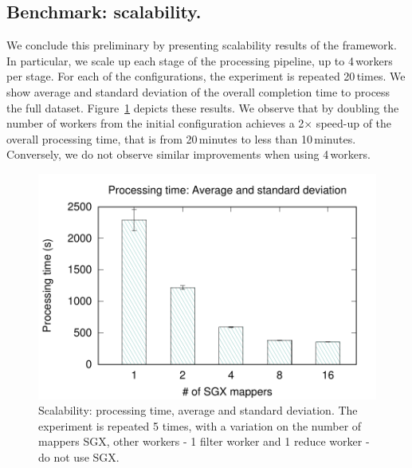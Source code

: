 \subsection{Benchmark: scalability.} We conclude this preliminary by presenting scalability results of the \SYS framework.
In particular, we scale up each stage of the processing pipeline, up to 4\,workers per stage.
For each of the configurations, the experiment is repeated 20\,times.
We show average and standard deviation of the overall completion time to process the full dataset.
Figure~\ref{fig:scalability} depicts these results.
We observe that by doubling the number of workers from the initial configuration achieves a 2$\times$ speed-up of the overall processing time, that is from 20\,minutes to less than 10\,minutes.
Conversely, we do not observe similar improvements when using 4\,workers.

\begin{figure}[t!]
  \centering
  \includegraphics[scale=0.5]{plots/secure_streams/scalability/sgxmapper_scalability.pdf}
  \caption{Scalability: processing time, average and standard deviation. The experiment is repeated 5 times, with a variation on the number of mappers SGX, other workers - 1 filter worker and 1 reduce worker - do not use SGX.}
  \label{fig:scalability}
\end{figure}

